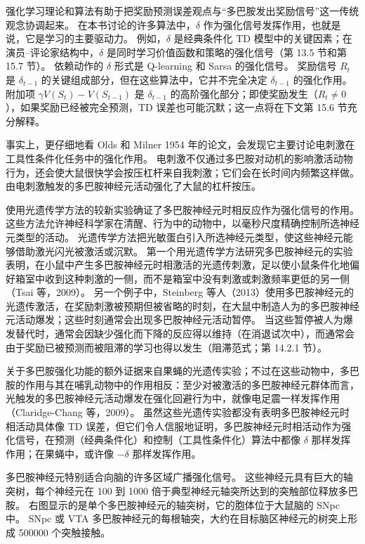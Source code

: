 \documentclass[UTF8, 12pt, fontset=fandol, oneside]{ctexart}
\begin{document}
强化学习理论和算法有助于把奖励预测误差观点与“多巴胺发出奖励信号”这一传统观念协调起来。
在本书讨论的许多算法中，$\delta$ 作为强化信号发挥作用，也就是说，它是学习的主要驱动力。
例如，$\delta$ 是经典条件化 TD 模型中的关键因素；在演员--评论家结构中，$\delta$ 是同时学习价值函数和策略的强化信号（第 13.5 节和第 15.7 节）。
依赖动作的 $\delta$ 形式是 Q-learning 和 Sarsa 的强化信号。
奖励信号 $R_t$ 是 $\delta_{t-1}$ 的关键组成部分，但在这些算法中，它并不完全决定 $\delta_{t-1}$ 的强化作用。
附加项 $\gamma V(S_t)-V(S_{t-1})$ 是 $\delta_{t-1}$ 的高阶强化部分；即使奖励发生（$R_t\neq 0$），如果奖励已经被完全预测，TD 误差也可能沉默；这一点将在下文第 15.6 节充分解释。

事实上，更仔细地看 Olds 和 Milner 1954 年的论文，会发现它主要讨论电刺激在工具性条件化任务中的强化作用。
电刺激不仅通过多巴胺对动机的影响激活动物行为，还会使大鼠很快学会按压杠杆来自我刺激；它们会在长时间内频繁这样做。
由电刺激触发的多巴胺神经元活动强化了大鼠的杠杆按压。

使用光遗传学方法的较新实验确证了多巴胺神经元时相反应作为强化信号的作用。
这些方法允许神经科学家在清醒、行为中的动物中，以毫秒尺度精确控制所选神经元类型的活动。
光遗传学方法把光敏蛋白引入所选神经元类型，使这些神经元能够借助激光闪光被激活或沉默。
第一个用光遗传学方法研究多巴胺神经元的实验表明，在小鼠中产生多巴胺神经元时相激活的光遗传刺激，足以使小鼠条件化地偏好箱室中收到这种刺激的一侧，而不是箱室中没有刺激或刺激频率更低的另一侧（Tsai 等，2009）。
另一个例子中，Steinberg 等人（2013）使用多巴胺神经元的光遗传激活，在奖励刺激被预期但被省略的时刻，在大鼠中制造人为的多巴胺神经元活动爆发；这些时刻通常会出现多巴胺神经元活动暂停。
当这些暂停被人为爆发替代时，通常会因缺少强化而下降的反应得以维持（在消退试次中），而通常会由于奖励已被预测而被阻滞的学习也得以发生（阻滞范式；第 14.2.1 节）。

关于多巴胺强化功能的额外证据来自果蝇的光遗传实验；不过在这些动物中，多巴胺的作用与其在哺乳动物中的作用相反：至少对被激活的多巴胺神经元群体而言，光触发的多巴胺神经元活动爆发在强化回避行为中，就像电足震一样发挥作用（Claridge-Chang 等，2009）。
虽然这些光遗传实验都没有表明多巴胺神经元时相活动具体像 TD 误差，但它们令人信服地证明，多巴胺神经元时相活动作为强化信号，在预测（经典条件化）和控制（工具性条件化）算法中都像 $\delta$ 那样发挥作用；在果蝇中，或许像 $-\delta$ 那样发挥作用。

多巴胺神经元特别适合向脑的许多区域广播强化信号。
这些神经元具有巨大的轴突树，每个神经元在 100 到 1000 倍于典型神经元轴突所达到的突触部位释放多巴胺。
右图显示的是单个多巴胺神经元的轴突树，它的胞体位于大鼠脑的 SNpc 中。
SNpc 或 VTA 多巴胺神经元的每根轴突，大约在目标脑区神经元的树突上形成 500000 个突触接触。
\end{document}

